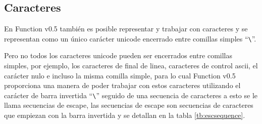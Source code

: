      \subsection{Caracteres}
      En Function v0.5 también es posible representar y trabajar con caracteres y se representan como un único carácter unicode encerrado entre comillas simples ``\texttt{\textbackslash}''.
      
      \begin{fxcode}
      \end{fxcode}
      
      Pero no todos los caracteres unicode pueden ser encerrados entre comillas simples, por ejemplo, los caracteres de final de linea, caracteres de control ascii, el carácter nulo e incluso la misma comilla simple, para lo cual Function v0.5 proporciona una manera de poder trabajar con estos caracteres utilizando el carácter  de barra invertida ``\texttt{\textbackslash}'' seguido de una secuencia de caracteres a esto se le llama secuencias de escape, las secuencias de escape son secuencias de caracteres que empiezan con la barra invertida  y se detallan en la tabla \ref{tb:escsequence}.
      

